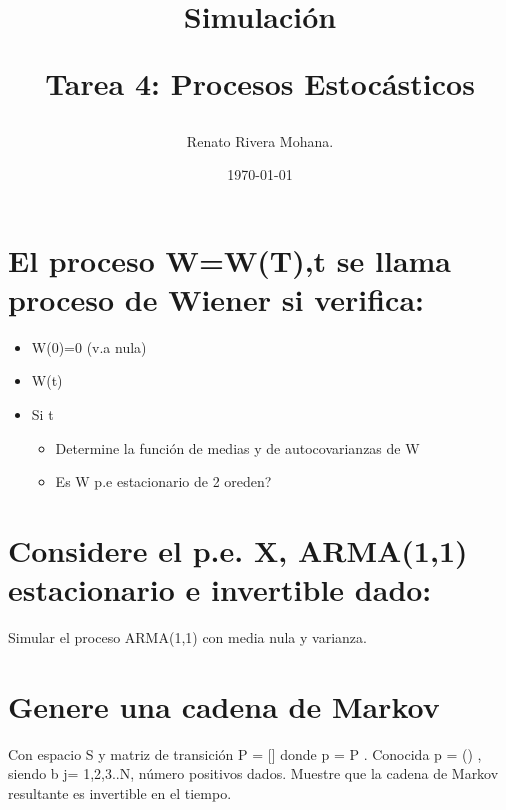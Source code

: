 \documentclass[letter, 10pt]{article}
\begin{document}
\title{Simulaci\'on \\ \begin{Large}Tarea 4: Procesos Estoc\'asticos\end{Large}}
\author{Renato Rivera Mohana.}
\date{\today}
\maketitle

\section{El proceso W={W(T),t }se llama proceso de Wiener si verifica:}
\begin{itemize}
\item W(0)=0 (v.a nula)
\item {W(t)}
\item Si t
\begin{itemize}
\item Determine la funci\'on de medias y de autocovarianzas de W
\item Es W p.e estacionario de 2 oreden?
\end{itemize}
\end{itemize}
\section{Considere el p.e. X, ARMA(1,1) estacionario e invertible dado:}
Simular el proceso ARMA(1,1) con media nula y varianza.
\section{Genere una cadena de Markov}
Con espacio S y matriz de transici\'on P = [] donde p = P . Conocida p = () ,  siendo b j= 1,2,3..N, n\'umero positivos dados.
Muestre que la cadena de Markov resultante es invertible en el tiempo.
\end{document}

